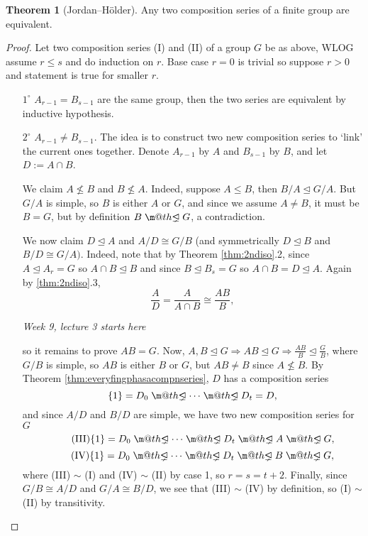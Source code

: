 \documentclass[a4paper]{article}
\makeatletter
\DeclareRobustCommand{\pns}{\mathrel{\text{$\m@th\proper@ideal$}}}
\newcommand{\proper@ideal}{%
  \ooalign{$\lneq$\cr\raise.22ex\hbox{$\lhd$}\cr}%
}
\theoremstyle{definition}
\newtheorem{thm}[defn]{Theorem}
\makeatother
\begin{document}
\begin{thm}[Jordan–Hölder]
Any two composition series of a finite group are equivalent.
\end{thm}
\begin{proof}
Let two composition series (I) and (II) of a group $G$ be as above, WLOG assume $r\leq s$ and do induction on $r$. Base case $r=0$ is trivial so suppose $r>0$ and statement is true for smaller $r$.
\begin{enumerate}
\item[$1^\circ$] $A_{r-1}=B_{s-1}$ are the same group, then the two series are equivalent by inductive hypothesis.
\item[$2^\circ$] $A_{r-1}\neq B_{s-1}$. The idea is to construct two new composition series to `link' the current ones together. Denote $A_{r-1}$ by $A$ and $B_{s-1}$ by $B$, and let $D:=A\cap B$.

We claim $A\not\leq B$ and $B\not\leq A$. Indeed, suppose $A\leq B$, then $B/A\unlhd G/A$. But $G/A$ is simple, so $B$ is either $A$ or $G$, and since we assume $A\neq B$, it must be $B=G$, but by definition $B\pns G$, a contradiction.

We now claim $D\unlhd A$ and $A/D\cong G/B$ (and symmetrically $D\unlhd B$ and $B/D\cong G/A)$. Indeed, note that by Theorem \ref{thm:2ndiso}.2, since $A\unlhd A_r=G$ so $A\cap B\unlhd B$ and since $B\unlhd B_s=G$ so $A\cap B=D\unlhd A$. Again by \ref{thm:2ndiso}.3,
\[
\frac{A}{D} = \frac{A}{A\cap B} \cong \frac{AB}{B},
\]

\begin{flushright}
\textit{Week 9, lecture 3 starts here}
\end{flushright}

so it remains to prove $AB=G$. Now, $A,B\unlhd G\Rightarrow AB\unlhd G\Rightarrow\frac{AB}{B}\unlhd \frac{G}{B}$, where $G/B$ is simple, so $AB$ is either $B$ or $G$, but $AB\neq B$ since $A\not\leq B$. By Theorem \ref{thm:everyfingphasacompnseries}, $D$ has a composition series
\[
\{1\}=D_0\pns\cdots\pns D_t=D,
\]
and since $A/D$ and $B/D$ are simple, we have two new composition series for $G$
\[
\tag{III}
\{1\}=D_0\pns \cdots\pns D_t\pns A\pns G,
\]
\[
\tag{IV}
\{1\}=D_0\pns \cdots\pns D_t\pns B\pns G,
\]
where (III) $\sim$ (I) and (IV) $\sim$ (II) by case 1, so $r=s=t+2$. Finally, since $G/B\cong A/D$ and $G/A\cong B/D$, we see that (III) $\sim$ (IV) by definition, so (I) $\sim$ (II) by transitivity.
\end{enumerate}
\end{proof}
\end{document}
